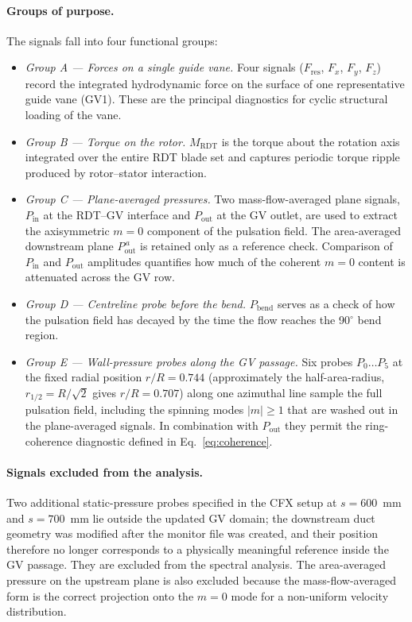 \paragraph{Groups of purpose.}
The signals fall into four functional groups:
\begin{itemize}
  \item \emph{Group A — Forces on a single guide vane.} Four signals
        ($F_{\mathrm{res}}$, $F_x$, $F_y$, $F_z$) record the
        integrated hydrodynamic force on the surface of one
        representative guide vane (GV1). These are the principal
        diagnostics for cyclic structural loading of the vane.
  \item \emph{Group B — Torque on the rotor.}
        $M_{\mathrm{RDT}}$ is the torque about the rotation axis
        integrated over the entire RDT blade set and captures
        periodic torque ripple produced by rotor--stator
        interaction.
  \item \emph{Group C — Plane-averaged pressures.} Two mass-flow-averaged
        plane signals, $P_{\mathrm{in}}$ at the RDT--GV
        interface and $P_{\mathrm{out}}$ at the GV outlet, are
        used to extract the axisymmetric $m=0$ component of the
        pulsation field. The area-averaged downstream plane
        $P_{\mathrm{out}}^{\,a}$ is retained only as a reference check.
        Comparison of $P_{\mathrm{in}}$ and $P_{\mathrm{out}}$
        amplitudes quantifies how much of the coherent $m=0$ content
        is attenuated across the GV row.
  \item \emph{Group D — Centreline probe before the bend.}
        $P_{\mathrm{bend}}$ serves as a check of how the pulsation
        field has decayed by the time the flow reaches the 90$^\circ$
        bend region.
  \item \emph{Group E — Wall-pressure probes along the GV passage.}
        Six probes $P_0 \ldots P_5$ at the fixed radial position
        $r/R = 0.744$ (approximately the half-area-radius,
        $r_{1/2} = R/\sqrt{2}$ gives $r/R = 0.707$) along one
        azimuthal line sample the full pulsation field, including
        the spinning modes $|m|\geq 1$ that are washed out in the
        plane-averaged signals. In combination with $P_{\mathrm{out}}$
        they permit the ring-coherence diagnostic defined in
        Eq.~\eqref{eq:coherence}.
\end{itemize}
 
\paragraph{Signals excluded from the analysis.}
Two additional static-pressure probes specified in the CFX setup at
$s = 600$~mm and $s = 700$~mm lie outside the updated GV
domain; the downstream duct geometry was modified after the monitor
file was created, and their position therefore no longer corresponds
to a physically meaningful reference inside the GV passage.
They are excluded from the spectral analysis. The area-averaged
pressure on the upstream plane is also excluded because the
mass-flow-averaged form is the correct projection onto the $m=0$
mode for a non-uniform velocity distribution.
 

